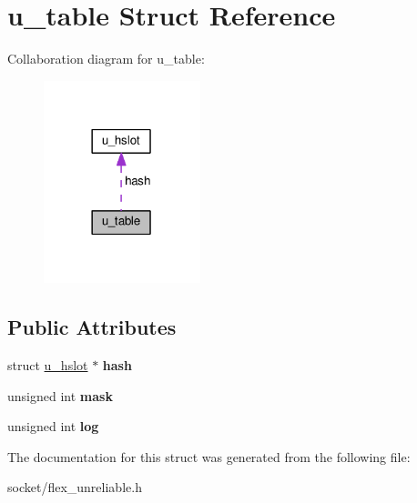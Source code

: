 \hypertarget{structu__table}{}\section{u\+\_\+table Struct Reference}
\label{structu__table}


Collaboration diagram for u\+\_\+table\+:\nopagebreak
\begin{figure}[H]
\begin{center}
\leavevmode
\includegraphics[width=129pt]{structu__table__coll__graph}
\end{center}
\end{figure}
\subsection*{Public Attributes}
\begin{DoxyCompactItemize}
\item 
struct \hyperlink{structu__hslot}{u\+\_\+hslot} $\ast$ {\bfseries hash}\hypertarget{structu__table_a9d4512b1f9f38f0a6a24841ce2ca32a6}{}\label{structu__table_a9d4512b1f9f38f0a6a24841ce2ca32a6}

\item 
unsigned int {\bfseries mask}\hypertarget{structu__table_aeb1108e804777cac0e332f0310a78f09}{}\label{structu__table_aeb1108e804777cac0e332f0310a78f09}

\item 
unsigned int {\bfseries log}\hypertarget{structu__table_ab9c33f2ba15bf3544b0176fbe59ccecd}{}\label{structu__table_ab9c33f2ba15bf3544b0176fbe59ccecd}

\end{DoxyCompactItemize}


The documentation for this struct was generated from the following file\+:\begin{DoxyCompactItemize}
\item 
socket/flex\+\_\+unreliable.\+h\end{DoxyCompactItemize}
